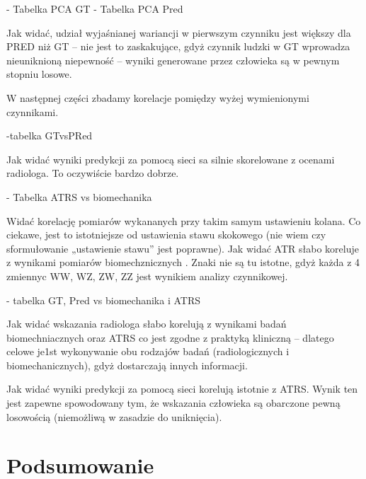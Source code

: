 - Tabelka PCA GT
- Tabelka PCA Pred

Jak widać, udział wyjaśnianej wariancji w pierwszym czynniku jest większy dla PRED niż GT – nie jest to zaskakujące, gdyż czynnik ludzki w GT wprowadza nieuniknioną niepewność – wyniki generowane przez człowieka są w pewnym stopniu losowe. 

W następnej części zbadamy korelacje pomiędzy wyżej wymienionymi czynnikami.

-tabelka GTvsPRed

Jak widać wyniki predykcji za pomocą sieci sa silnie skorelowane z ocenami radiologa. To oczywiście bardzo dobrze. 

- Tabelka ATRS vs biomechanika

Widać  korelację  pomiarów wykananych przy takim samym ustawieniu kolana. Co ciekawe, jest to istotniejsze od ustawienia  stawu skokowego (nie wiem czy sformułowanie „ustawienie stawu” jest poprawne). Jak widać ATR słabo koreluje z wynikami pomiarów biomechznicznych . 
Znaki nie są tu istotne, gdyż każda z 4 zmiennyc WW, WZ, ZW, ZZ jest wynikiem analizy czynnikowej. 

- tabelka GT, Pred vs biomechanika i ATRS

Jak widać wskazania radiologa słabo korelują z wynikami badań biomechniacznych oraz ATRS co jest zgodne z praktyką kliniczną – dlatego celowe je1st wykonywanie obu rodzajów badań (radiologicznych i biomechanicznych), gdyż dostarczają innych informacji. 

Jak widać wyniki predykcji za pomocą sieci korelują istotnie z ATRS. Wynik ten jest zapewne spowodowany tym, że wskazania człowieka są obarczone pewną losowością (niemożliwą w zasadzie do uniknięcia). 

\chapter{Podsumowanie}




